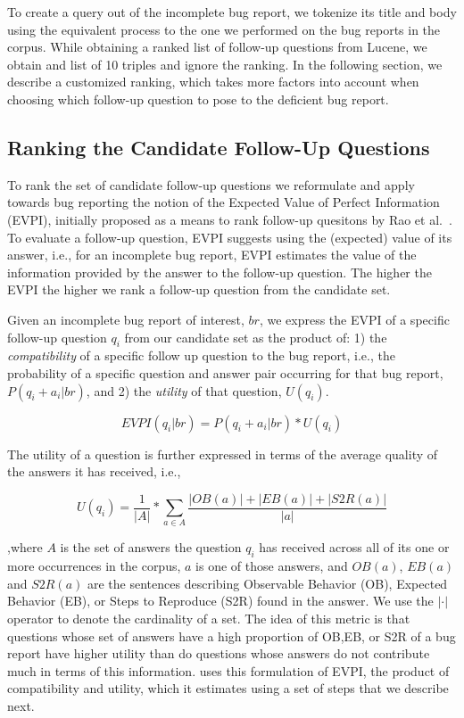 To create a query out of the incomplete bug report, we tokenize its title and body
using the equivalent process to the one we performed on the bug reports in the corpus.
While obtaining a ranked list of follow-up questions from Lucene, we obtain and list of 10
triples and ignore the ranking. In the following section, we describe a customized ranking, which
takes more factors into account when choosing which follow-up question to pose to the deficient
bug report.


\subsection{Ranking the Candidate Follow-Up Questions}\label{sec:ranking}

To rank the set of candidate follow-up questions we reformulate and apply towards bug reporting
the notion of the Expected Value of Perfect Information (EVPI), initially proposed as a means to
rank follow-up quesitons by Rao et al.~\cite{rao-daume-iii-2018-learning}. To evaluate a follow-up question, EVPI suggests
using the (expected) value of its answer, i.e., for an
incomplete bug report, EVPI estimates the value of the information provided by the answer to the
follow-up question. The higher the EVPI the higher we rank a follow-up question from the candidate
set.

Given an incomplete bug report of interest, $br$, we express the EVPI of a specific follow-up question $q_{i}$ from our candidate set
as the product of: 1) the {\em compatibility} of a specific follow up question to the bug report, i.e.,
the probability of a specific question and answer pair occurring for that bug report, $P(q_{i}+a_{i}|br)$, and 2) the {\em utility} of that question, $U(q_{i})$.

$$EVPI(q_{i}|br) = P(q_{i}+a_{i}|br) * U(q_{i})$$

The utility of a question is further expressed in terms of the average quality of the answers it has received, i.e.,

$$U(q_{i}) = \frac{1}{|A|} * \sum_{a \in A}^{} \frac{|OB(a)|+|EB(a)|+|S2R(a)|}{|a|}$$

\noindent
,where $A$ is the set of answers the question $q_{i}$ has received across all of its one or more occurrences in the
corpus, $a$ is one of those answers, and $OB(a)$, $EB(a)$ and $S2R(a)$ are the sentences describing Observable Behavior (OB), Expected Behavior (EB), or
Steps to Reproduce (S2R) found in the answer. We use the $|\cdot|$ operator to denote the cardinality of a set.
The idea of this metric is that questions whose set of answers have a high proportion
of OB,EB, or S2R of a bug report have higher utility than do questions whose answers do not contribute much in
terms of this information. \evpi uses this formulation of EVPI, the product of compatibility and utility, which it
estimates using a set of steps that we describe next.

